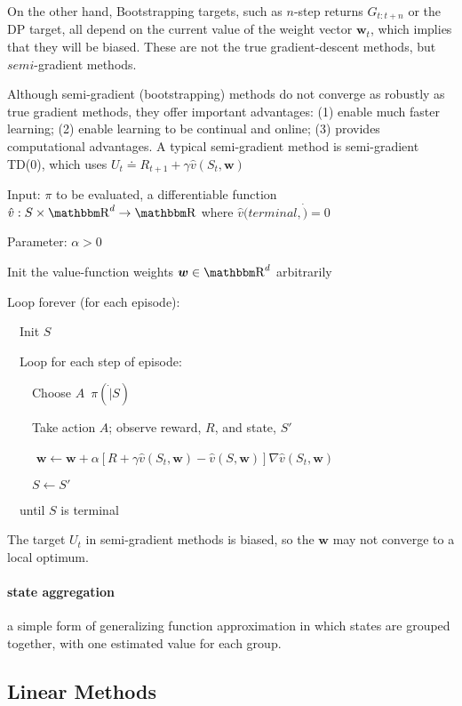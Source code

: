 \documentclass[sutton_barto_notes.tex]{subfiles}
\begin{document}
On the other hand, Bootstrapping targets, such as $n$-step returns $G_{t:t+n}$ or the DP target, all depend on the current value of the weight vector $\bm{w}_t$, which implies that they will be biased. These are not the true gradient-descent methods, but $semi$-gradient methods.

Although semi-gradient (bootstrapping) methods do not converge as robustly as true gradient methods, they offer important advantages: (1) enable much faster learning; (2) enable learning to be continual and online; (3) provides computational advantages. A typical semi-gradient method is semi-gradient TD(0), which uses $U_t \doteq R_{t+1} + \gamma \hat{v}(S_t, \bm{w})$

\begin{tcolorbox}[width=1.1\textwidth,title={Semi-gradient TD(0) for Estimating $\hat{v}\approx v_\pi$}]
Input: $\pi$ to be evaluated, a differentiable function $\hat{v}:S\times\R^d \rightarrow \R$ where $\hat{v}(terminal,\dot)=0$

Parameter: $\alpha > 0$

Init the value-function weights $\bm{w} \in \R^d$ arbitrarily

Loop forever (for each episode):

$\quad$Init $S$

$\quad$Loop for each step of episode:

$\quad\quad$Choose $A$~$\pi(\dot | S)$

$\quad\quad$Take action $A$; observe reward, $R$, and state, $S'$

$\quad\quad$ $\bm{w} \leftarrow \bm{w} + \alpha [ R + \gamma \hat{v}(S_t, \bm{w}) - \hat{v}(S,\bm{w})]\nabla \hat{v}(S_t, \bm{w})$

$\quad\quad S \leftarrow S'$

$\quad$until $S$ is terminal
\end{tcolorbox}

The target $U_t$ in semi-gradient methods is biased, so the $\bm{w}$ may not converge to a local optimum.



\paragraph{state aggregation} a simple form of generalizing function approximation in which states are grouped together, with one estimated value for each group.



\subsection{Linear Methods}
\end{document}
